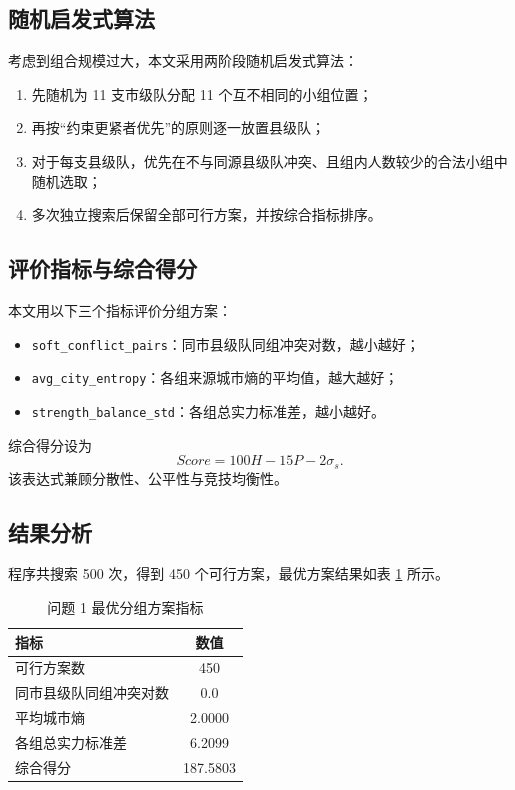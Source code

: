 \documentclass[UTF8,a4paper,12pt]{ctexart}
\begin{document}
\subsection{随机启发式算法}

考虑到组合规模过大，本文采用两阶段随机启发式算法：

\begin{enumerate}
  \item 先随机为 11 支市级队分配 11 个互不相同的小组位置；
  \item 再按“约束更紧者优先”的原则逐一放置县级队；
  \item 对于每支县级队，优先在不与同源县级队冲突、且组内人数较少的合法小组中随机选取；
  \item 多次独立搜索后保留全部可行方案，并按综合指标排序。
\end{enumerate}

\subsection{评价指标与综合得分}

本文用以下三个指标评价分组方案：

\begin{itemize}
  \item \texttt{soft\_conflict\_pairs}：同市县级队同组冲突对数，越小越好；
  \item \texttt{avg\_city\_entropy}：各组来源城市熵的平均值，越大越好；
  \item \texttt{strength\_balance\_std}：各组总实力标准差，越小越好。
\end{itemize}

综合得分设为
\[
Score = 100H - 15P - 2\sigma_s.
\]
该表达式兼顾分散性、公平性与竞技均衡性。

\subsection{结果分析}

程序共搜索 500 次，得到 450 个可行方案，最优方案结果如表 \ref{tab:problem1} 所示。

\begin{table}[H]
\centering
\caption{问题 1 最优分组方案指标}
\label{tab:problem1}
\begin{tabular}{lc}
\toprule
指标 & 数值 \\
\midrule
可行方案数 & 450 \\
同市县级队同组冲突对数 & 0.0 \\
平均城市熵 & 2.0000 \\
各组总实力标准差 & 6.2099 \\
综合得分 & 187.5803 \\
\bottomrule
\end{tabular}
\end{table}
\end{document}
